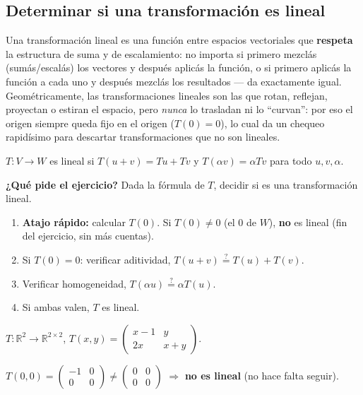 \documentclass[11pt,a4paper]{article}
\newcommand{\qpide}[1]{\textbf{¿Qué pide el ejercicio?} #1\par}
\begin{document}
\subsection{Determinar si una transformación es lineal}

\begin{intuicion}
Una transformación lineal es una función entre espacios vectoriales que \textbf{respeta}
la estructura de suma y de escalamiento: no importa si primero mezclás (sumás/escalás)
los vectores y después aplicás la función, o si primero aplicás la función a cada uno y
después mezclás los resultados — da exactamente igual. Geométricamente, las
transformaciones lineales son las que rotan, reflejan, proyectan o estiran el espacio,
pero \emph{nunca} lo trasladan ni lo ``curvan'': por eso el origen siempre queda fijo en
el origen ($T(0)=0$), lo cual da un chequeo rapidísimo para descartar transformaciones que
no son lineales.
\end{intuicion}

\begin{teoria}[Definición]
$T:V\to W$ es lineal si $T(u+v)=Tu+Tv$ y $T(\alpha v)=\alpha Tv$ para todo $u,v,\alpha$.
\end{teoria}

\qpide{Dada la fórmula de $T$, decidir si es una transformación lineal.}

\begin{proc}
\begin{enumerate}
    \item \textbf{Atajo rápido:} calcular $T(0)$. Si $T(0)\neq0$ (el $0$ de $W$),
    \textbf{no} es lineal (fin del ejercicio, sin más cuentas).
    \item Si $T(0)=0$: verificar aditividad, $T(u+v)\stackrel{?}{=}T(u)+T(v)$.
    \item Verificar homogeneidad, $T(\alpha u)\stackrel{?}{=}\alpha T(u)$.
    \item Si ambas valen, $T$ es lineal.
\end{enumerate}
\end{proc}

\begin{ejemplo}
$T:\mathbb R^2\to\mathbb R^{2\times2}$, $T(x,y)=\begin{pmatrix}x-1&y\\2x&x+y\end{pmatrix}$.

$T(0,0)=\begin{pmatrix}-1&0\\0&0\end{pmatrix}\neq\begin{pmatrix}0&0\\0&0\end{pmatrix}$
$\Rightarrow$ \textbf{no es lineal} (no hace falta seguir).
\end{ejemplo}
\end{document}
